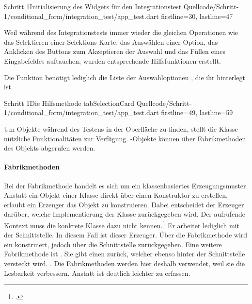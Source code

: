 \begin{alexlisting}{Schritt 1}{Initialisierung des Widgets für den Integrationstest}
  {Quellcode/Schritt-1/conditional_form/integration_test/app_test.dart}
  {firstline=30, lastline=47}
  \label{lst:Schritt1IntegrationsTestWidgetInitialisierung}
\end{alexlisting}



Weil während des Integrationstests immer wieder die gleichen Operationen wie das Selektieren einer Selektions-Karte, das Auswählen einer Option, das Anklicken des Buttons zum Akzeptieren der Auswahl und das Füllen eines Eingabefeldes auftauchen, wurden entsprechende Hilfsfunktionen erstellt.


Die Funktion  \Lst{\ref{lst:Schritt1HilfsmethodeTabSelectionCard}} benötigt lediglich die Liste der Auswahloptionen , die ihr hinterlegt ist.
 

\begin{alexlisting}{Schritt 1}{Die Hilfsmethode tabSelectionCard}
  {Quellcode/Schritt-1/conditional_form/integration_test/app_test.dart}
  {firstline=49, lastline=59}
  \label{lst:Schritt1HilfsmethodeTabSelectionCard}
\end{alexlisting}

Um Objekte während des Testens in der Oberfläche zu finden, stellt die Klasse  nützliche Funktionalitäten zur Verfügung.
-Objekte können über Fabrikmethoden des Objekts  abgerufen werden.

\paragraph{Fabrikmethoden}
Bei der Fabrikmethode handelt es sich um ein klassenbasiertes Erzeugungsmuster.
Anstatt ein Objekt einer Klasse direkt über einen Konstruktor zu erstellen, erlaubt ein Erzeuger das Objekt zu konstruieren.
Dabei entscheidet der Erzeuger darüber, welche Implementierung der Klasse zurückgegeben wird.
Der aufrufende Kontext muss die konkrete Klasse dazu nicht kennen.\footcite[Vgl.][107-116]{gamma2009entwurfsmuster} Er arbeitet lediglich mit der Schnittstelle. In diesem Fall ist  dieser Erzeuger. Über die Fabrikmethode  wird ein  konstruiert, jedoch über die Schnittstelle  zurückgegeben. Eine weitere Fabrikmethode ist . Sie gibt einen  zurück, welcher ebenso hinter der Schnittstelle  versteckt wird. . Die Fabrikmethoden werden hier deshalb verwendet, weil sie die Lesbarkeit verbessern. Anstatt  ist  deutlich leichter zu erfassen.




